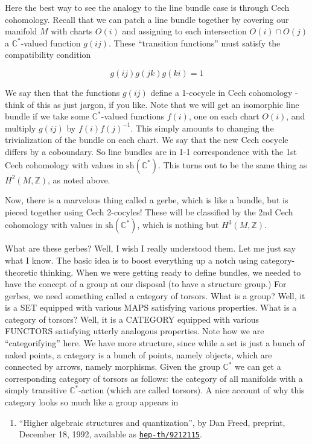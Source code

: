 \documentclass{article}
\def\tightlist{}
\begin{document}
Here the best way to see the analogy to the line bundle case is through
Cech cohomology. Recall that we can patch a line bundle together by
covering our manifold \(M\) with charts \(O(i)\) and assigning to each
intersection \(O(i) \cap O(j)\) a \(\mathbb{C}^*\)-valued function
\(g(ij)\). These ``transition functions'' must satisfy the compatibility
condition

\[g(ij) g(jk) g(ki) = 1\]

We say then that the functions \(g(ij)\) define a 1-cocycle in Cech
cohomology - think of this as just jargon, if you like. Note that we
will get an isomorphic line bundle if we take some
\(\mathbb{C}^*\)-valued functions \(f(i)\), one on each chart \(O(i)\),
and multiply \(g(ij)\) by \(f(i)f(j)^{-1}\). This simply amounts to
changing the trivialization of the bundle on each chart. We say that the
new Cech cocycle differs by a coboundary. So line bundles are in 1-1
correspondence with the 1st Cech cohomology with values in
\(\mathrm{sh}(\mathbb{C}^*)\). This turns out to be the same thing as
\(H^2(M,\mathbb{Z})\), as noted above.

Now, there is a marvelous thing called a gerbe, which is like a bundle,
but is pieced together using Cech 2-cocyles! These will be classified by
the 2nd Cech cohomology with values in \(\mathrm{sh}(\mathbb{C}^*)\),
which is nothing but \(H^3(M,\mathbb{Z})\).

What are these gerbes? Well, I wish I really understood them. Let me
just say what I know. The basic idea is to boost everything up a notch
using category-theoretic thinking. When we were getting ready to define
bundles, we needed to have the concept of a group at our disposal (to
have a structure group.) For gerbes, we need something called a category
of torsors. What is a group? Well, it is a SET equipped with various
MAPS satisfying various properties. What is a category of torsors? Well,
it is a CATEGORY equipped with various FUNCTORS satisfying utterly
analogous properties. Note how we are ``categorifying'' here. We have
more structure, since while a set is just a bunch of naked points, a
category is a bunch of points, namely objects, which are connected by
arrows, namely morphisms. Given the group \(\mathbb{C}^*\) we can get a
corresponding category of torsors as follows: the category of all
manifolds with a simply transitive \(\mathbb{C}^*\)-action (which are
called torsors). A nice account of why this category looks so much like
a group appears in

\begin{enumerate}
\def\labelenumi{\arabic{enumi})}
\setcounter{enumi}{4}
\tightlist
\item
  ``Higher algebraic structures and quantization'', by Dan Freed,
  preprint, December 18, 1992, available as
  \href{http://xxx.lanl.gov/abs/hep-th/9212115}{\texttt{hep-th/9212115}}.
\end{enumerate}
\end{document}

